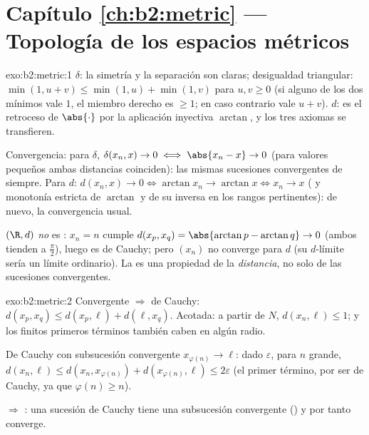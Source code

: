 \section*{Capítulo \ref{ch:b2:metric} --- Topología de los espacios métricos}

\begin{solution}{exo:b2:metric:1}
$\delta$: la simetría y la separación son claras; desigualdad
triangular: $\min(1, u + v) \leq \min(1,u) + \min(1,v)$ para $u, v
\geq 0$ (si alguno de los dos mínimos vale $1$, el miembro derecho es
$\geq 1$; en caso contrario vale $u + v$). $d$: es el retroceso de
$\abs{\cdot}$ por la aplicación inyectiva $\arctan$, y los tres
axiomas se transfieren.

Convergencia: para $\delta$, $\delta(x_n, x) \to 0 \iff \abs{x_n - x}
\to 0$ (para valores pequeños ambas distancias coinciden): las mismas
sucesiones convergentes de siempre. Para $d$: $d(x_n, x) \to 0 \iff
\arctan x_n \to \arctan x \iff x_n \to x$ ( y monotonía
estricta de $\arctan$ y de su inversa en los rangos pertinentes): de
nuevo, la convergencia usual.

$(\R, d)$ \emph{no} es : $x_n = n$ cumple $d(x_p, x_q) =
\abs{\arctan p - \arctan q} \to 0$ (ambos tienden a $\frac\pi2$),
luego es de Cauchy; pero $(x_n)$ no converge para $d$ (su $d$-límite
sería un límite ordinario). La  es una propiedad de la
\emph{distancia}, no solo de las sucesiones convergentes.
\end{solution}

\begin{solution}{exo:b2:metric:2}
Convergente $\Rightarrow$ de Cauchy: $d(x_p, x_q) \leq d(x_p, \ell) +
d(\ell, x_q)$. Acotada: a partir de $N$, $d(x_n, \ell) \leq 1$; y los
finitos primeros términos también caben en algún radio.

De Cauchy con subsucesión convergente $x_{\varphi(n)} \to \ell$: dado
$\varepsilon$, para $n$ grande, $d(x_n, \ell) \leq d(x_n,
x_{\varphi(n)}) + d(x_{\varphi(n)}, \ell) \leq 2\varepsilon$ (el
primer término, por ser de Cauchy, ya que $\varphi(n) \geq n$).

 $\Rightarrow$ : una sucesión de Cauchy tiene una
subsucesión convergente () y por tanto converge.
\end{solution}


